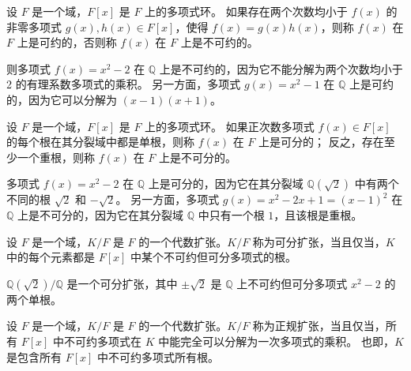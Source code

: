 \begin{definition}
    设 $F$ 是一个域，$F[x]$ 是 $F$ 上的多项式环。
    如果存在两个次数均小于 $f(x)$ 的非零多项式 $g(x),h(x)\in F[x]$，使得 $f(x)=g(x)h(x)$，则称 $f(x)$ 在 $F$ 上是可约的，否则称 $f(x)$ 在 $F$ 上是不可约的。
    \label{def:reducible_irreducible_polynomial}
\end{definition}
\begin{note}
    则多项式 $f(x)=x^2-2$ 在 $\mathbb{Q}$ 上是不可约的，因为它不能分解为两个次数均小于 2 的有理系数多项式的乘积。
    另一方面，多项式 $g(x)=x^2-1$ 在 $\mathbb{Q}$ 上是可约的，因为它可以分解为 $(x-1)(x+1)$。
\end{note}

\begin{definition}
    设 $F$ 是一个域，$F[x]$ 是 $F$ 上的多项式环。
    如果正次数多项式 $f(x)\in F[x]$ 的每个根在其分裂域中都是单根，则称 $f(x)$ 在 $F$ 上是可分的；
    反之，存在至少一个重根，则称 $f(x)$ 在 $F$ 上是不可分的。
    \label{def:separable_inseparable_polynomial}
\end{definition}
\begin{note}
    多项式 $f(x)=x^2-2$ 在 $\mathbb{Q}$ 上是可分的，因为它在其分裂域 $\mathbb{Q}(\sqrt{2})$ 中有两个不同的根 $\sqrt{2}$ 和 $-\sqrt{2}$。
    另一方面，多项式 $g(x)=x^2-2x+1=(x-1)^2$ 在 $\mathbb{Q}$ 上是不可分的，因为它在其分裂域 $\mathbb{Q}$ 中只有一个根 $1$，且该根是重根。
\end{note}
\vspace{1em}

\begin{definition}
    设 $F$ 是一个域，$K/F$ 是 $F$ 的一个代数扩张。$K/F$ 称为可分扩张，当且仅当，$K$ 中的每个元素都是 $F[x]$ 中某个不可约但可分多项式的根。
\end{definition}
\begin{note}
    $\mathbb{Q}(\sqrt{2})/\mathbb{Q}$ 是一个可分扩张，其中 $\pm\sqrt{2}$ 是 $\mathbb{Q}$ 上不可约但可分多项式 $x^2-2$ 的两个单根。
\end{note}
\vspace{1em}

\begin{definition}
    设 $F$ 是一个域，$K/F$ 是 $F$ 的一个代数扩张。$K/F$ 称为正规扩张，当且仅当，所有 $F[x]$ 中不可约多项式在 $K$ 中能完全可以分解为一次多项式的乘积。
    也即，$K$ 是包含所有 $F[x]$ 中不可约多项式所有根。
    \label{def:normal_extension}
\end{definition}

